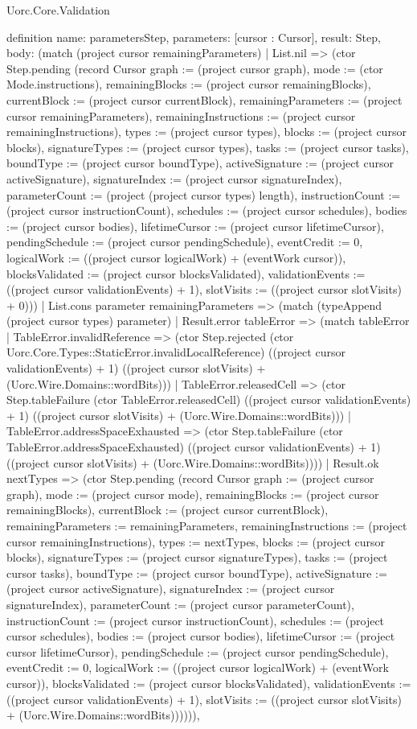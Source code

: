 \begin{lexlean}{Uorc.Core.Validation}
\begin{semanticmodule}
definition{
  name: parametersStep,
  parameters: [cursor : Cursor],
  result: Step,
  body: (match (project cursor remainingParameters)
    | List.nil => (ctor Step.pending (record Cursor {graph := (project cursor graph), mode := (ctor Mode.instructions), remainingBlocks := (project cursor remainingBlocks), currentBlock := (project cursor currentBlock), remainingParameters := (project cursor remainingParameters), remainingInstructions := (project cursor remainingInstructions), types := (project cursor types), blocks := (project cursor blocks), signatureTypes := (project cursor types), tasks := (project cursor tasks), boundType := (project cursor boundType), activeSignature := (project cursor activeSignature), signatureIndex := (project cursor signatureIndex), parameterCount := (project (project cursor types) length), instructionCount := (project cursor instructionCount), schedules := (project cursor schedules), bodies := (project cursor bodies), lifetimeCursor := (project cursor lifetimeCursor), pendingSchedule := (project cursor pendingSchedule), eventCredit := 0, logicalWork := ((project cursor logicalWork) + (eventWork cursor)), blocksValidated := (project cursor blocksValidated), validationEvents := ((project cursor validationEvents) + 1), slotVisits := ((project cursor slotVisits) + 0)}))
    | List.cons parameter remainingParameters => (match (typeAppend (project cursor types) parameter)
      | Result.error tableError => (match tableError
        | TableError.invalidReference => (ctor Step.rejected (ctor Uorc.Core.Types::StaticError.invalidLocalReference) ((project cursor validationEvents) + 1) ((project cursor slotVisits) + (Uorc.Wire.Domains::wordBits)))
        | TableError.releasedCell => (ctor Step.tableFailure (ctor TableError.releasedCell) ((project cursor validationEvents) + 1) ((project cursor slotVisits) + (Uorc.Wire.Domains::wordBits)))
        | TableError.addressSpaceExhausted => (ctor Step.tableFailure (ctor TableError.addressSpaceExhausted) ((project cursor validationEvents) + 1) ((project cursor slotVisits) + (Uorc.Wire.Domains::wordBits))))
      | Result.ok nextTypes => (ctor Step.pending (record Cursor {graph := (project cursor graph), mode := (project cursor mode), remainingBlocks := (project cursor remainingBlocks), currentBlock := (project cursor currentBlock), remainingParameters := remainingParameters, remainingInstructions := (project cursor remainingInstructions), types := nextTypes, blocks := (project cursor blocks), signatureTypes := (project cursor signatureTypes), tasks := (project cursor tasks), boundType := (project cursor boundType), activeSignature := (project cursor activeSignature), signatureIndex := (project cursor signatureIndex), parameterCount := (project cursor parameterCount), instructionCount := (project cursor instructionCount), schedules := (project cursor schedules), bodies := (project cursor bodies), lifetimeCursor := (project cursor lifetimeCursor), pendingSchedule := (project cursor pendingSchedule), eventCredit := 0, logicalWork := ((project cursor logicalWork) + (eventWork cursor)), blocksValidated := (project cursor blocksValidated), validationEvents := ((project cursor validationEvents) + 1), slotVisits := ((project cursor slotVisits) + (Uorc.Wire.Domains::wordBits))})))),
}
\end{semanticmodule}
\end{lexlean}
